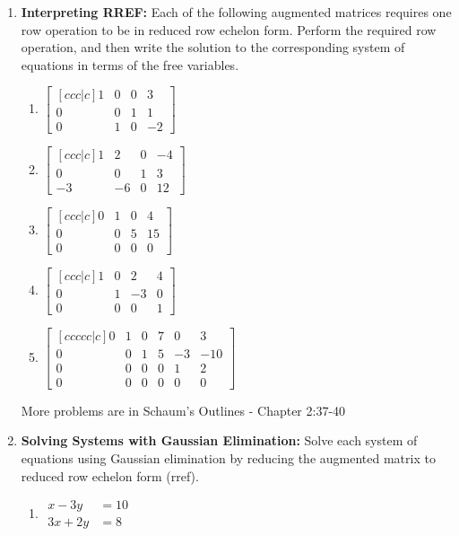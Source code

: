 \begin{enumerate}
\item \textbf{Interpreting RREF:} Each of the following augmented
  matrices requires one row operation to be in reduced row echelon
  form. Perform the required row operation, and then write the
  solution to the corresponding system of equations in terms of the free variables.
\begin{multicols}{3}
\begin{enumerate}
	\item 
$
\begin{bmatrix}[ccc|c]
 1 & 0 & 0 & 3 \\
 0 & 0 & 1 & 1 \\
 0 & 1 & 0 & -2
\end{bmatrix}
$
	\item 
$
\begin{bmatrix}[ccc|c]
 1 & 2 & 0 & -4 \\
 0 & 0 & 1 & 3 \\
 -3 & -6 & 0 & 12
\end{bmatrix}
$
	\item 
$
\begin{bmatrix}[ccc|c]
 0 & 1 & 0 & 4 \\
 0 & 0 & 5 & 15 \\
 0 & 0 & 0 & 0
\end{bmatrix}
$
	\item 
$
\begin{bmatrix}[ccc|c]
 1 & 0 & 2 & 4 \\
 0 & 1 & -3 & 0 \\
 0 & 0 & 0 & 1
\end{bmatrix}
$
	\item 
$
\begin{bmatrix}[ccccc|c]
 0 & 1 & 0 & 7 & 0 & 3 \\
 0 & 0 & 1 & 5 & -3 & -10 \\
 0 & 0 & 0 & 0 & 1 & 2 \\
 0 & 0 & 0 & 0 & 0 & 0
\end{bmatrix}
$
\end{enumerate}
\end{multicols}

More problems are in Schaum's Outlines - 
Chapter 2:37-40


\item \textbf{Solving Systems with Gaussian Elimination:} Solve each system of equations using Gaussian elimination by reducing the augmented matrix to reduced row echelon form (rref).
\begin{multicols}{3}
\begin{enumerate}
	\item 
$
\begin{array}{rl}
 x  -3y &= 10 \\
 3x +2y &= 8
\end{array}
$



\end{enumerate}
\end{multicols}
\end{enumerate}
